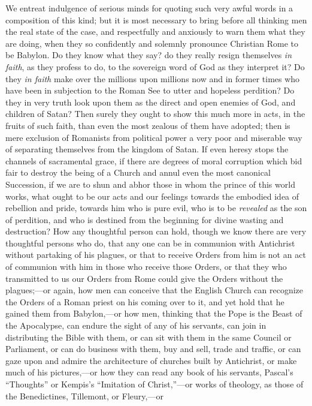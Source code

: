 We entreat indulgence of serious minds for quoting such very awful
words in a composition of this kind; but it is most necessary to bring
before all thinking men the real state of the case, and respectfully
and anxiously to warn them what they are doing, when they so
confidently and solemnly pronounce Christian Rome to be Babylon. Do
they know what they say? do they really resign themselves \emph{in
faith}, as they profess to do, to the sovereign word of God as they
interpret it? Do they \emph{in faith} make over the millions upon
millions now and in former times who have been in subjection to the
Roman See to utter and hopeless perdition? Do they in very truth look
upon them as the direct and open enemies of God, and children of
Satan? Then surely they ought to show this much more in acts, in the
fruits of such faith, than even the most zealous of them have adopted;
then is mere exclusion of Romanists from political power a very poor
and miserable way of separating themselves from the kingdom of Satan.
If even heresy stops the channels of sacramental grace, if there are
degrees of moral corruption which bid fair to destroy the being of a
Church and annul even the most canonical Succession, if we are to shun
and abhor those in whom the prince of this world works, what ought to
be our acts and our feelings towards the embodied idea of rebellion
and pride, towards him who is pure evil, who is to be \emph{revealed}
as the son of perdition, and who is destined from the beginning for
divine wasting and destruction? How any thoughtful person can hold,
though we know there are very thoughtful persons who do, that any one
can be in communion with Antichrist without partaking of his plagues,
or that to receive Orders from him is not an act of communion with him
in those who receive those Orders, or that they who transmitted to us
our Orders from Rome could give the Orders without the plagues;—or
again, how men can conceive that the English Church can recognize the
Orders of a Roman priest on his coming over to it, and yet hold that
he gained them from Babylon,—or how men, thinking that the Pope is
the Beast of the Apocalypse, can endure the sight of any of his
servants, can join in distributing the Bible with them, or can sit
with them in the same Council or Parliament, or can do business with
them, buy and sell, trade and traffic, or can gaze upon and admire the
architecture of churches built by Antichrist, or make much of his
pictures,—or how they can read any book of his servants, Pascal's
``Thoughts'' or Kempis's ``Imitation of Christ,''—or
works of theology, as those of the Benedictines, Tillemont, or Fleury,—or

